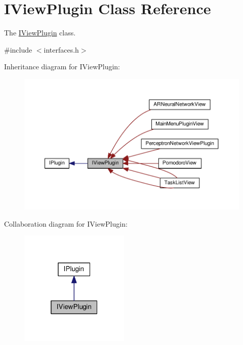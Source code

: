 \hypertarget{class_i_view_plugin}{}\section{I\+View\+Plugin Class Reference}
\label{class_i_view_plugin}


The \hyperlink{class_i_view_plugin}{I\+View\+Plugin} class.  




{\ttfamily \#include $<$interfaces.\+h$>$}



Inheritance diagram for I\+View\+Plugin\+:\nopagebreak
\begin{figure}[H]
\begin{center}
\leavevmode
\includegraphics[width=350pt]{class_i_view_plugin__inherit__graph}
\end{center}
\end{figure}


Collaboration diagram for I\+View\+Plugin\+:\nopagebreak
\begin{figure}[H]
\begin{center}
\leavevmode
\includegraphics[width=148pt]{class_i_view_plugin__coll__graph}
\end{center}
\end{figure}
